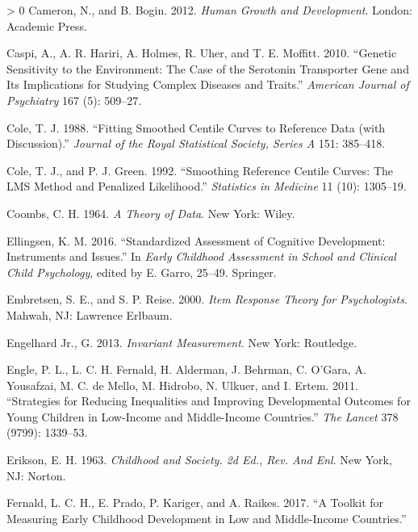 \documentclass[
]{book}
\newlength{\cslhangindent}
\newenvironment{CSLReferences}[3] %
 {%
  \setlength{\parindent}{0pt}
  \ifodd #1 \everypar{\setlength{\hangindent}{\cslhangindent}}\ignorespaces\fi
  \ifnum #2 > 0
  \setlength{\parskip}{#2\baselineskip}
  \fi
 }%
 {}
\begin{document}
\begin{CSLReferences}{1}{0}
\leavevmode\hypertarget{ref-cameron2012}{}%
Cameron, N., and B. Bogin. 2012. \emph{Human Growth and Development}. London: Academic Press.

\leavevmode\hypertarget{ref-caspi2010genetic}{}%
Caspi, A., A. R. Hariri, A. Holmes, R. Uher, and T. E. Moffitt. 2010. {``Genetic Sensitivity to the Environment: The Case of the Serotonin Transporter Gene and Its Implications for Studying Complex Diseases and Traits.''} \emph{American Journal of Psychiatry} 167 (5): 509--27.

\leavevmode\hypertarget{ref-cole1988}{}%
Cole, T. J. 1988. {``Fitting Smoothed Centile Curves to Reference Data (with Discussion).''} \emph{Journal of the Royal Statistical Society, Series A} 151: 385--418.

\leavevmode\hypertarget{ref-cole1992}{}%
Cole, T. J., and P. J. Green. 1992. {``Smoothing Reference Centile Curves: The {LMS} Method and Penalized Likelihood.''} \emph{Statistics in Medicine} 11 (10): 1305--19.

\leavevmode\hypertarget{ref-coombs1964}{}%
Coombs, C. H. 1964. \emph{A Theory of Data}. New York: Wiley.

\leavevmode\hypertarget{ref-ellingsen2016}{}%
Ellingsen, K. M. 2016. {``Standardized Assessment of Cognitive Development: Instruments and Issues.''} In \emph{Early Childhood Assessment in School and Clinical Child Psychology}, edited by E. Garro, 25--49. Springer.

\leavevmode\hypertarget{ref-embretsen2000}{}%
Embretsen, S. E., and S. P. Reise. 2000. \emph{Item Response Theory for Psychologists}. Mahwah, NJ: Lawrence Erlbaum.

\leavevmode\hypertarget{ref-engelhard2013}{}%
Engelhard Jr., G. 2013. \emph{Invariant Measurement}. New York: Routledge.

\leavevmode\hypertarget{ref-engle2011}{}%
Engle, P. L., L. C. H. Fernald, H. Alderman, J. Behrman, C. O'Gara, A. Yousafzai, M. C. de Mello, M. Hidrobo, N. Ulkuer, and I. Ertem. 2011. {``Strategies for Reducing Inequalities and Improving Developmental Outcomes for Young Children in Low-Income and Middle-Income Countries.''} \emph{The Lancet} 378 (9799): 1339--53.

\leavevmode\hypertarget{ref-erikson1963}{}%
Erikson, E. H. 1963. \emph{Childhood and Society. 2d Ed., Rev. And Enl}. New York, NJ: Norton.

\leavevmode\hypertarget{ref-fernald2017toolkit}{}%
Fernald, L. C. H., E. Prado, P. Kariger, and A. Raikes. 2017. {``A Toolkit for Measuring Early Childhood Development in Low and Middle-Income Countries.''}


\end{CSLReferences}
\end{document}
